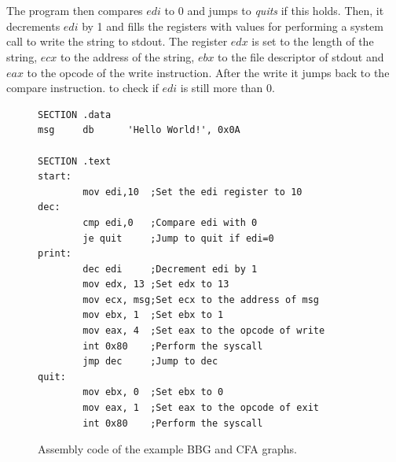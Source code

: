 \documentclass{kththesis}
\renewcommand{\it}[1]{\textit{#1}}
\begin{document}
\\ \\
The program then compares $edi$ to 0 and jumps to \it{quits} if this holds. Then, it decrements $edi$ by 1 and fills the registers with values for performing a system call to write the string to stdout. The register $edx$ is set to the length of the string, $ecx$ to the address of the string, $ebx$ to the file descriptor of stdout and $eax$ to the opcode of the write instruction. After the write it jumps back to the compare instruction. to check if $edi$ is still more than 0. 
\begin{figure}[t]
    \centering
\begin{tcolorbox}
\begin{verbatim}
SECTION .data
msg     db      'Hello World!', 0x0A

SECTION .text
start:
        mov edi,10  ;Set the edi register to 10
dec:
        cmp edi,0   ;Compare edi with 0
        je quit     ;Jump to quit if edi=0
print:
        dec edi     ;Decrement edi by 1
        mov edx, 13 ;Set edx to 13
        mov ecx, msg;Set ecx to the address of msg
        mov ebx, 1  ;Set ebx to 1
        mov eax, 4  ;Set eax to the opcode of write
        int 0x80    ;Perform the syscall
        jmp dec     ;Jump to dec
quit:
        mov ebx, 0  ;Set ebx to 0
        mov eax, 1  ;Set eax to the opcode of exit
        int 0x80    ;Perform the syscall
\end{verbatim}
\end{tcolorbox}
\caption{Assembly code of the example BBG and CFA graphs.}
    \label{fig:assembly}
\end{figure}
\end{document}
